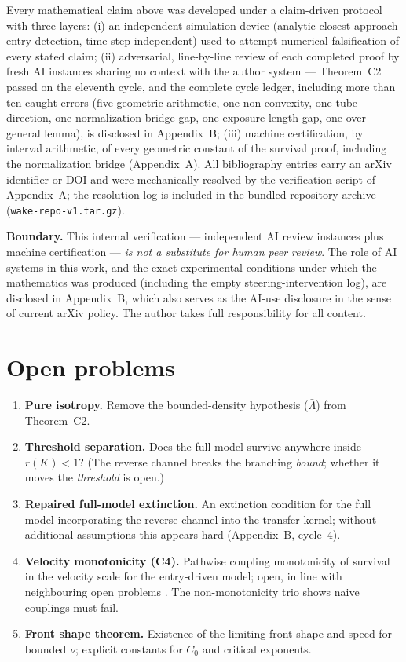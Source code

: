 \documentclass[11pt]{article}
\newcommand{\relL}{\bar\Lambda}
\begin{document}
Every mathematical claim above was developed under a claim-driven protocol
with three layers: (i) an independent simulation device (analytic
closest-approach entry detection, time-step independent) used to attempt
numerical falsification of every stated claim; (ii) adversarial,
line-by-line review of each completed proof by fresh AI instances sharing no
context with the author system --- Theorem~C2 passed on the eleventh cycle,
and the complete cycle ledger, including more than ten caught errors (five
geometric-arithmetic, one non-convexity, one tube-direction, one
normalization-bridge gap, one exposure-length gap, one over-general lemma),
is disclosed in Appendix~B; (iii) machine certification, by interval
arithmetic, of every geometric constant of the survival proof, including the
normalization bridge (Appendix~A). All bibliography entries carry an arXiv
identifier or DOI and were mechanically resolved by the verification script
of Appendix~A; the resolution log is included in the bundled repository
archive (\texttt{wake-repo-v1.tar.gz}).

\textbf{Boundary.} This internal verification --- independent AI review
instances plus machine certification --- \emph{is not a substitute for human
peer review}. The role of AI systems in this work, and the exact experimental
conditions under which the mathematics was produced (including the empty
steering-intervention log), are disclosed in Appendix~B, which also serves
as the AI-use disclosure in the sense of current arXiv policy. The author
takes full responsibility for all content.

\section{Open problems}\label{sec:open}

\begin{enumerate}
\item \textbf{Pure isotropy.} Remove the bounded-density hypothesis
($\relL$) from Theorem~C2.
\item \textbf{Threshold separation.} Does the full model survive anywhere
inside $r(K)<1$? (The reverse channel breaks the branching \emph{bound};
whether it moves the \emph{threshold} is open.)
\item \textbf{Repaired full-model extinction.} An extinction condition for
the full model incorporating the reverse channel into the transfer kernel;
without additional assumptions this appears hard (Appendix~B, cycle~4).
\item \textbf{Velocity monotonicity (C4).} Pathwise coupling monotonicity of
survival in the velocity scale for the entry-driven model; open, in line
with neighbouring open problems \cite{ks05,linkerremenik}. The
non-monotonicity trio shows naive couplings must fail.
\item \textbf{Front shape theorem.} Existence of the limiting front shape
and speed for bounded $\nu$; explicit constants for $C_0$ and critical
exponents.
\end{enumerate}
\end{document}

